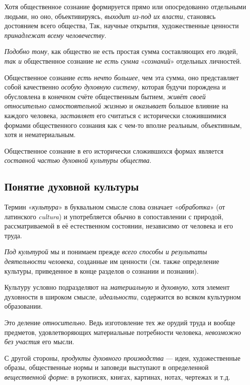 \documentclass[a4paper,14pt,russian]{extreport}
\begin{document}
Хотя общественное сознание формируется прямо или опосредованно отдельными людьми, но оно, объективируясь, \emph{выходит из-под их власти}, становясь достоянием всего общества, Так, научные открытия, художественные ценности \emph{принадлежат всему человечеству}.

\emph{Подобно тому}, как общество не есть простая сумма составляющих его людей, \emph{так и} общественное сознание \emph{не есть сумма} «\emph{сознаний}» отдельных личностей.

Общественное сознание \emph{есть нечто большее}, чем эта сумма, оно представляет собой качественно \emph{особую духовную систему}, которая будучи порождена и обусловлена в конечном счёте общественным бытием, \emph{живёт своей относительно самостоятельной жизнью} и \emph{оказывает} большое влияние на каждого человека, \emph{заставляет} его считаться с исторически сложившимися формами общественного сознания как с чем-то вполне реальным, объективным, хотя и нематериальным.

Общественное сознание в его исторически сложившихся формах является \emph{составной частью духовной культуры общества}.

\subsection{Понятие духовной культуры}

Термин «\emph{культура}» в буквальном смысле слова означает «\emph{обработка}» (от латинского \emph{cultura}) и употребляется обычно в сопоставлении с природой, рассматриваемой в её естественном состоянии, независимо от человека и его труда.

\emph{Под культурой} мы и понимаем прежде \emph{всего способы и результаты деятельности человека}, созданные им ценности (см. также определение культуры, приведенное в конце разделов о сознании и познании).

Культуру условно подразделяют на \emph{материальную} и \emph{духовную}, хотя элемент духовности в широком смысле, \emph{идеальности}, содержится во всяком культурном образовании.

Это деление \emph{относительно}. Ведь изготовление тех же орудий труда и вообще предметов, удовлетворяющих материальные потребности человека, \emph{невозможно без участия} его мысли.

С другой стороны, \emph{продукты духовного производства} --- идеи, художественные образы, общественные нормы и заповеди выступают в определенной \emph{вещественной форме}: в рукописях, книгах, картинах, нотах, чертежах и т.д.
\end{document}
